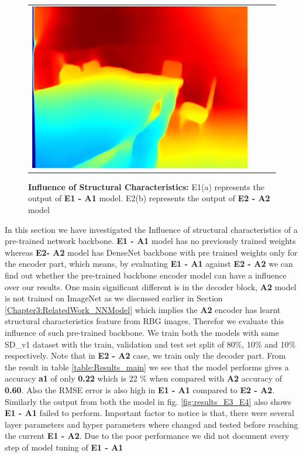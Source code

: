 \begin{figure}[h]
\begin{tabular}{@{}c@{ }c@{ }c@{ }c@{}}
\includegraphics[width=.3\linewidth]{Figures/results/s1_a1/0Predicted.png}\\[-1ex]
\end{tabular}
\caption{\textbf{Influence of Structural Characteristics:} E1(a) represents the output of \textbf{E1 - A1} model. E2(b) represents the output of \textbf{E2 - A2} model  }%
\label{fig:results_E1_E2}
\end{figure}

\label{Chapter6:Influence_Structural_Char}
In this section we have investigated the Influence of structural characteristics of a pre-trained network backbone. \textbf{E1 - A1} model has no previously trained weights whereas \textbf{E2- A2} model has DenseNet backbone with pre trained weights only for the encoder part, which means, by evaluating \textbf{E1 - A1} against \textbf{E2 - A2} we can find out whether the pre-trained backbone encoder model can have a influence over our results. One main significant different is in the decoder block, \textbf{A2} model is not trained on ImageNet as we discussed earlier in Section \ref{Chapter3:RelatedWork_NNModel} which implies the \textbf{A2} encoder has learnt structural characteristics feature from RBG images. Therefor we evaluate this influence of such pre-trained backbone. We train both the models with same SD\_v1 dataset with the train, validation and test set split of 80\%, 10\%  and 10\% respectively. Note that in \textbf{E2 - A2} case, we train only the decoder part. From the result in table \ref{table:Results_main} we see that the model performs gives a accuracy \textbf{a1} of only \textbf{0.22} which is 22 \% when compared with \textbf{A2} accuracy of \textbf{0.60}. Also the RMSE error is also high in \textbf{E1 - A1} compared to \textbf{E2 - A2}. Similarly the output from both the model in fig. \ref{fig:results_E3_E4} also shows  \textbf{E1 - A1} failed to perform. Important factor to notice is that, there were several layer parameters and hyper parameters where changed and tested before reaching the current \textbf{E1 - A2}. Due to the poor performance we did not document every step of model tuning of \textbf{E1 - A1} 


